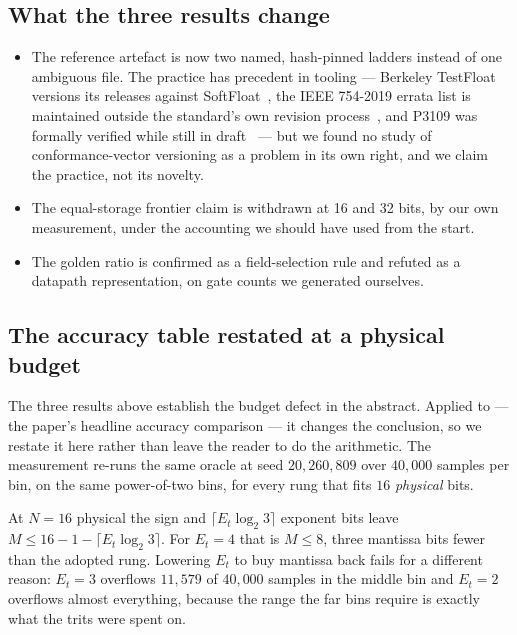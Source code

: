 \subsection{What the three results change}

\begin{itemize}[leftmargin=*]
\item The reference artefact is now two named, hash-pinned ladders instead of one
ambiguous file. The practice has precedent in tooling --- Berkeley TestFloat
versions its releases against SoftFloat~\cite{hauser2018testfloat}, the IEEE
754-2019 errata list is maintained outside the standard's own revision
process~\cite{ieee754errata2021}, and P3109 was formally verified while still in
draft~\cite{wintersteiger2025} --- but we found no study of conformance-vector
versioning as a problem in its own right, and we claim the practice, not its
novelty.
\item The equal-storage frontier claim is withdrawn at 16 and 32 bits, by our own
measurement, under the accounting we should have used from the start.
\item The golden ratio is confirmed as a field-selection rule and refuted as a
datapath representation, on gate counts we generated ourselves.
\end{itemize}


\subsection{The accuracy table restated at a physical budget}
\label{sec:accphys}

The three results above establish the budget defect in the abstract. Applied to
 --- the paper's headline accuracy comparison --- it changes the
conclusion, so we restate it here rather than leave the reader to do the
arithmetic. The measurement re-runs the same oracle at seed $20{,}260{,}809$ over
$40{,}000$ samples per bin, on the same power-of-two bins, for every rung that fits
$16$ \emph{physical} bits.

At $N=16$ physical the sign and $\lceil E_t\log_2 3\rceil$ exponent bits leave
$M \le 16-1-\lceil E_t\log_2 3\rceil$. For $E_t=4$ that is $M \le 8$, three
mantissa bits fewer than the adopted rung. Lowering $E_t$ to buy mantissa back
fails for a different reason: $E_t=3$ overflows $11{,}579$ of $40{,}000$ samples in
the middle bin and $E_t=2$ overflows almost everything, because the range the far
bins require is exactly what the trits were spent on.

